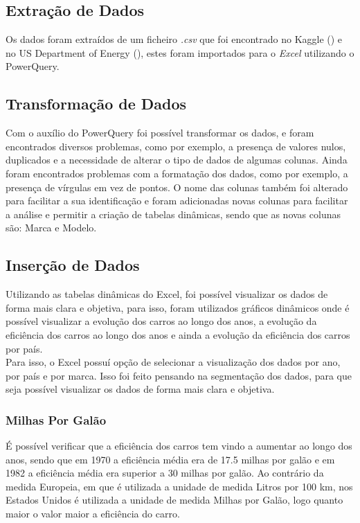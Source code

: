 \documentclass[a4paper]{article}
\begin{document}
\subsection{Extração de Dados}
Os dados foram extraídos de um ficheiro \textit{.csv} que foi encontrado no Kaggle (\cite{kaggle}) e no US Department of Energy (\cite{usdoe}), 
estes foram importados para o \textit{Excel} utilizando o PowerQuery.
\subsection{Transformação de Dados}
Com o auxílio do PowerQuery foi possível transformar os dados, e foram encontrados diversos problemas,
como por exemplo, a presença de valores nulos, duplicados e a necessidade de alterar o tipo de dados de algumas colunas.
Ainda foram encontrados problemas com a formatação dos dados, como por exemplo, a presença de vírgulas em vez de pontos.
O nome das colunas também foi alterado para facilitar a sua identificação e foram adicionadas novas colunas para facilitar a análise
e permitir a criação de tabelas dinâmicas, sendo que as novas colunas são: Marca e Modelo.

\subsection{Inserção de Dados}
Utilizando as tabelas dinâmicas do Excel, foi possível visualizar os dados de forma mais clara e objetiva,
para isso, foram utilizados gráficos dinâmicos onde é possível visualizar a evolução dos carros ao longo dos anos,
a evolução da eficiência dos carros ao longo dos anos e ainda a evolução da eficiência dos carros por país.
\\
Para isso, o Excel possuí opção de selecionar a visualização dos dados por ano, por país e por marca.
Isso foi feito pensando na segmentação dos dados, para que seja possível visualizar os dados de forma mais clara e objetiva.

\newpage

\subsubsection{Milhas Por Galão}
É possível verificar que a eficiência dos carros tem vindo a aumentar ao longo dos anos,
sendo que em 1970 a eficiência média era de 17.5 milhas por galão e em 1982 a eficiência média 
era superior a 30 milhas por galão. Ao contrário da medida Europeia, em que é utilizada a unidade de medida
Litros por 100 km, nos Estados Unidos é utilizada a unidade de medida Milhas por Galão, logo quanto maior o valor
maior a eficiência do carro.
\end{document}
